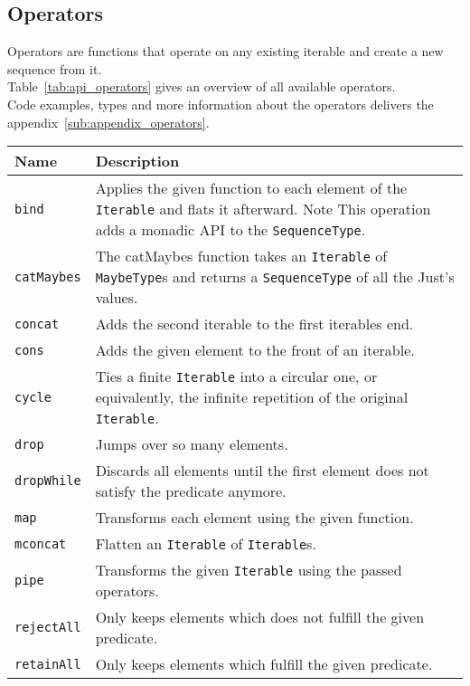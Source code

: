 \subsection{Operators} %
\label{sub:api_Operators}
Operators are functions that operate on any existing iterable and create a
new sequence from it. \\
Table~\ref{tab:api_operators} gives an overview of all available operators.\\
Code examples, types and more information about the operators delivers the
appendix~\ref{sub:appendix_operators}.
\begin{table}[H]
  \centering
  \begin{tabularx}{\textwidth}{| l | X |} \hline
    \textbf{Name} & \textbf{Description} \\ \hline
    \texttt{bind} & Applies the given function to each element of the \texttt{Iterable} and flats it afterward. Note This operation adds a monadic API to the \texttt{SequenceType}. \\ \hline 
    \texttt{catMaybes} & The catMaybes function takes an \texttt{Iterable} of \texttt{MaybeType}s and returns a \texttt{SequenceType} of all the Just's values. \\ \hline 
    \texttt{concat} & Adds the second iterable to the first iterables end. \\ \hline 
    \texttt{cons} & Adds the given element to the front of an iterable. \\ \hline 
    \texttt{cycle} & Ties a finite \texttt{Iterable} into a circular one, or equivalently, the infinite repetition of the original \texttt{Iterable}. \\ \hline 
    \texttt{drop} & Jumps over so many elements. \\ \hline 
    \texttt{dropWhile} & Discards all elements until the first element does not satisfy the predicate anymore. \\ \hline 
    \texttt{map} & Transforms each element using the given function. \\ \hline 
    \texttt{mconcat} & Flatten an \texttt{Iterable} of \texttt{Iterable}s. \\ \hline 
    \texttt{pipe} & Transforms the given \texttt{Iterable} using the passed operators. \\ \hline 
    \texttt{rejectAll} & Only keeps elements which does not fulfill the given predicate. \\ \hline 
    \texttt{retainAll} & Only keeps elements which fulfill the given predicate. \\ \hline 

\end{tabularx}
\end{table}
